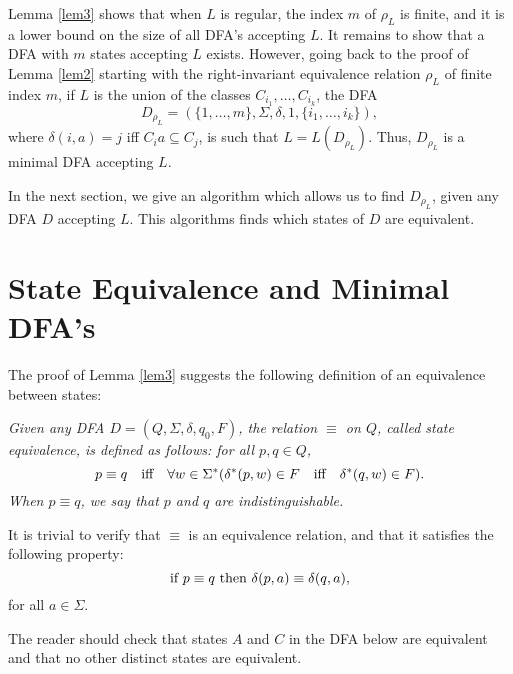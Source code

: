 \medskip
Lemma \ref{lem3} shows that when $L$ is regular, the index $m$ of
$\rho_L$ is finite, and it is a lower bound on the size of
all DFA's accepting $L$. It remains to show that 
a DFA with $m$ states accepting $L$ exists.
However, going back to the proof of Lemma \ref{lem2}
starting with the right-invariant equivalence relation
$\rho_L$ of finite index $m$, if $L$ is the union of the classes
$C_{i_{1}},\ldots, C_{i_{k}}$, the DFA
$$D_{\rho_{L}} = (\{1,\ldots, m\}, \Sigma, \delta, 1, 
\{i_1,\ldots,i_k\}),$$
where $\delta(i, a) = j$ iff $C_i a\subseteq C_j$,
is such that $L = L(D_{\rho_{L}})$.
Thus, $D_{\rho_{L}}$ is a minimal DFA accepting $L$.

\medskip
In the next section, we give an algorithm which allows
us to find $D_{\rho_{L}}$, given any DFA $D$ accepting $L$.
This algorithms finds which states of $D$ are equivalent.

\section{State Equivalence and Minimal DFA's}
\label{secmn3}
The proof of Lemma \ref{lem3} suggests the following definition
of an equivalence between states:

\begin{defin}
\label{equivS}
{\em 
Given any DFA  $D = (Q, \Sigma, \delta, q_0, F)$,
the relation $\equiv$ on $Q$, called {\it state equivalence\/},
is defined as follows: for all $p, q\in Q$,
$$p\equiv q\quad\hbox{iff}\quad
\forall w\in\Sigma^*(\delta^*(p,w)\in F\quad\hbox{iff}\quad
                           \delta^*(q,w)\in F).$$
When $p\equiv q$, we say that {\it $p$ and $q$ are indistinguishable\/}.
}
\end{defin}

\medskip
It is trivial to verify that $\equiv$ is an equivalence relation,
and that it satisfies the following property:
$$\hbox{if}\ p\equiv q\ \hbox{then}\ \delta(p, a) \equiv \delta(q, a),$$
for all $a\in \Sigma$. 

\medskip
The reader should check that states $A$ and $C$ in the DFA
below are equivalent and that no other distinct states are equivalent.

